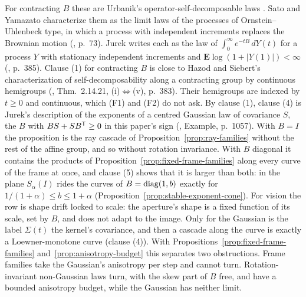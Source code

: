 For contracting $B$ these are Urbanik's operator-self-decomposable laws .
Sato and Yamazato characterize them as the limit laws of the processes of Ornstein--Uhlenbeck type, in
which a process with independent increments replaces the Brownian motion (,
p.~73). Jurek writes each as the law of $\int_0^\infty e^{-tB}\,dY(t)$ for a process $Y$ with stationary
independent increments and $\mathbf E\log(1 + |Y(1)|) < \infty$ (, p.~385).
Clause (1) for contracting $B$ is close to Hazod and Siebert's characterization of
self-decomposability along a contracting group by continuous hemigroups
(, Thm.~2.14.21, (i)$\Leftrightarrow$(v), p.~383). Their hemigroups are
indexed by $t \ge 0$ and continuous, which (F1) and (F2) do not ask. By clause (1), clause (4) is
Jurek's description of the exponents of a centred Gaussian law of covariance $S$, the $B$ with
$BS + SB^{\mathsf{T}} \ge 0$ in this paper's sign (, Example, p.~1057). With $B = I$ the proposition is the ray cascade of
Proposition~\ref{prop:ray-families} without the rest of the affine group, and so without rotation
invariance. With $B$ diagonal it contains the products of Proposition~\ref{prop:fixed-frame-families}
along every curve of the frame at once, and clause (5) shows that it is larger than both: in the plane
$S_\alpha(I)$ rides the curves of $B = \operatorname{diag}(1, b)$ exactly for $1/(1+\alpha) \le b \le 1 + \alpha$
(Proposition~\ref{prop:stable-exponent-cone}). For vision the row is
shape drift locked to scale: the aperture's shape is a fixed function of its scale, set by $B$, and does
not adapt to the image. Only for the Gaussian is the label $\Sigma(t)$ the kernel's covariance, and then
a cascade along the curve is exactly a Loewner-monotone curve (clause (4)). With
Propositions~\ref{prop:fixed-frame-families} and~\ref{prop:anisotropy-budget} this separates two
obstructions. Frame families take the Gaussian's anisotropy per step and cannot turn.
Rotation-invariant non-Gaussian laws turn, with the skew part of $B$ free, and have a bounded
anisotropy budget, while the Gaussian has neither limit.

